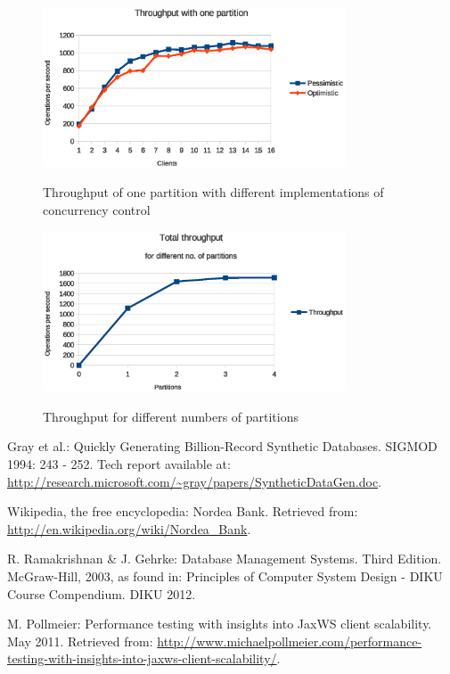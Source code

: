 \documentclass[12pt,a4paper,fleqn]{article}
\begin{document}
\begin{figure}
\centering
  \includegraphics[width=0.8\textwidth]{1par}\\
  \caption{Throughput of one partition with different implementations of concurrency control}
  \label{fig:1par}
\end{figure}

\begin{figure}
\centering
  \includegraphics[width=0.8\textwidth]{throughput}\\
  \caption{Throughput for different numbers of partitions}
  \label{fig:throughput}
\end{figure}


\begin{thebibliography}{1}

 Gray et al.: Quickly Generating Billion-Record Synthetic Databases. SIGMOD 1994: 243 - 252. Tech report available at: \url{http://research.microsoft.com/~gray/papers/SyntheticDataGen.doc}.

 Wikipedia, the free encyclopedia: Nordea Bank. Retrieved from: \url{http://en.wikipedia.org/wiki/Nordea_Bank}.

 R. Ramakrishnan \& J. Gehrke: Database Management Systems. Third Edition. McGraw-Hill, 2003, as found in: Principles of Computer System Design - DIKU Course Compendium. DIKU 2012.

 M. Pollmeier: Performance testing with insights into JaxWS client scalability. May 2011. Retrieved from: \url{http://www.michaelpollmeier.com/performance-testing-with-insights-into-jaxws-client-scalability/}.


\end{thebibliography}
\end{document}
